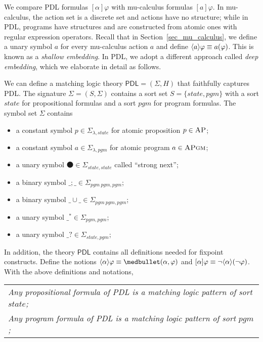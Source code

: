 \documentclass[letter,12pt]{article}
\newcommand{\sig}{{\Sigma}}
\newcommand{\MLPDL}{\mathsf{PDL}}
\newcommand{\AP}{\textsc{AP}}
\newcommand{\APgm}{\textsc{APgm}}
\newcommand{\snext}{{\medbullet}}
\newcommand{\statesort}{\mathit{state}}
\newcommand{\pgm}{\mathit{pgm}}
\DeclarePairedDelimiter{\angleBraces}{\langle}{\rangle}
\newcommand{\PDLseq}{\mathbin{;}}
\newcommand{\PDLunion}{\mathbin{\cup}}
\newcommand{\PDLstar}{^*}
\newcommand{\PDLquestion}{{?}}
\begin{document}
We compare PDL formulas $[\alpha] \varphi$
with mu-calculus formulas $[a]\varphi$.
In mu-calculus, the action set is a discrete set and actions have no structure;
while in PDL, programs have structures and are constructed from atomic ones with
regular expression operators.
Recall that in Section~\ref{sec_mu_calculus},
we define a unary symbol $a$ for every mu-calculus action $a$ and
define $\angleBraces{a} \varphi \equiv a(\varphi)$.
This is known as a \emph{shallow embedding}.
In PDL, we adopt a different approach called \emph{deep embedding},
which we elaborate in detail as follows.

We can define a matching logic theory $\MLPDL = (\sig, H)$ that
faithfully captures PDL.
The signature $\sig = (S,\Sigma)$ contains
a sort set $S = \{ \statesort , \pgm \}$ with
a sort $\statesort$ for propositional formulas and
a sort $\pgm$ for program formulas.
The symbol set $\Sigma$ contains
\begin{itemize}
\item a constant symbol $p \in \Sigma_{\lambda,\statesort}$
      for atomic proposition $p \in \AP$;
\item a constant symbol $a \in \Sigma_{\lambda,\pgm}$
      for atomic program $a \in \APgm$;
\item a unary symbol $\snext \in \Sigma_{\statesort,\statesort}$ called ``strong next'';
\item a binary symbol $\_\PDLseq\_ \in \Sigma_{\pgm \ \pgm , \pgm}$;
\item a binary symbol $\_ \PDLunion \_ \in \Sigma_{\pgm \ \pgm , \pgm}$;
\item a unary symbol $\_ \PDLstar \in \Sigma_{\pgm , \pgm}$;
\item a unary symbol $\_ \PDLquestion \in \Sigma_{\statesort, \pgm}$;
\end{itemize}
In addition, the theory $\MLPDL$ contains all definitions needed for fixpoint constructs.
Define the notions
$\angleBraces{\alpha} \varphi \equiv \snext(\alpha,\varphi)$
and $[\alpha] \varphi \equiv \neg \angleBraces{\alpha} (\neg \varphi)$.
With the above definitions and notations,
\begin{center}
\begin{tabular}{l}
\em
Any propositional formula of PDL is a matching logic pattern of sort $\statesort$;
\\
\em
Any program formula of PDL is a matching logic pattern of sort $\pgm$;
\end{tabular}
\end{center}
\end{document}
